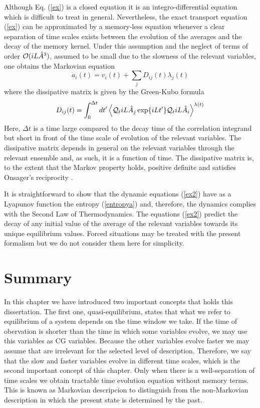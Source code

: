 \documentclass[b5paper,openright,11pt]{book}
\begin{document}
Although Eq.  (\ref{ex})  is a closed
equation it is an integro-differential  equation which is difficult to
treat  in   general.   Nevertheless,  the  exact   transport  equation
(\ref{ex}) can  be approximated by  a memory-less equation  whenever a
clear separation  of time scales  exists between the evolution  of the
averages and  the decay of  the memory kernel. Under  this assumption
and the  neglect of terms of  order ${\cal O}( iL\hat{A}^3)$,  assumed to be
small due to  the slowness of the relevant variables,  one obtains the
Markovian equation \cite{Grabert1982}
\begin{equation}
\dot{a}_i(t) = v_i(t) + \sum_j D_{ij}(t) \lambda_j(t)
\label{ex2}
\end{equation}
where  the  dissipative matrix  is  given  by  the Green-Kubo  formula
\begin{equation}
D_{ij}(t)=\int_0^{\Delta t} dt'\left\langle 
{\cal Q}_t iL\hat{A}_j\exp\{iLt'\}{\cal Q}_t iL\hat{A}_i
\right\rangle^{\lambda(t)}
\label{dij}
\end{equation}
Here,  $\Delta t$ is  a  time large  compared  to the  decay  time of  the
correlation  integrand  but  short  in  front of  the  time  scale  of
evolution of  the relevant variables.  The  dissipative matrix depends
in general  on the  relevant variables  through the  relevant ensemble
and, as such, it is a function of time.  The dissipative matrix is, to
the  extent that  the  Markov property  holds,  positive definite  and
satisfies Onsager's reciprocity \cite{Grabert1982}. 

It is straightforward  to show that the  dynamic equations (\ref{ex2})
have  as  a  Lyapunov   function  the  entropy  (\ref{entropya})  and,
therefore,   the   dynamics   complies   with  the   Second   Law   of
Thermodynamics.  The  equations (\ref{ex2})  predict the decay  of any
initial value  of the  average of the  relevant variables  towards its
unique equilibrium  values. Forced situations may  be treated
with the present  formalism \cite{Grabert1982} but we  do not consider
them here for simplicity.





\section{Summary}

In this chapter we have introduced two important concepts that holds this dissertation. The first one, quasi-equilibrium, states that what we refer to equilibrium of a system depends on the time window we take. If the time of obervation is shorter than the time in which some variables evolve, we may use this variables as CG variables. Because the other variables evolve faster we may assume that are irrelevant for the selected level of description. Therefore, we say that the slow and faster variables evolve in different time scales, which is the second important concept of this chapter. Only when there is a well-separation of time scales we obtain tractable time evolution equation without memory terms. This is known as Markovian descripcion to distinguish from the non-Markovian description in which the present state is determined by the past. 
\end{document}
